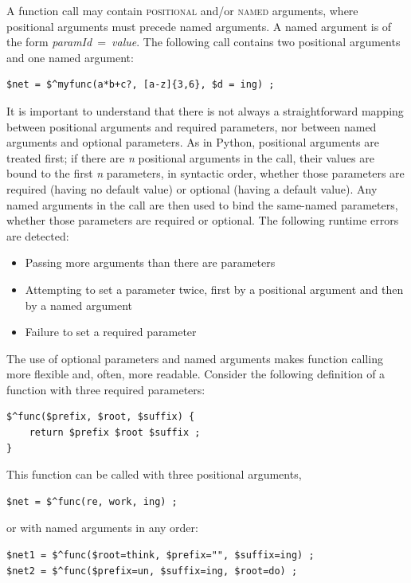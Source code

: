 \documentclass[letterpaper,12pt]{article}
\newcommand{\acro}{\textsc}
\begin{document}
A function call may contain \acro{positional} and/or \acro{named}
arguments, where positional arguments must precede named arguments.  A
named argument is of the form \emph{paramId}~=~\emph{value}.
The following call contains two positional arguments and one named
argument:

\begin{Verbatim}[fontsize=\small]
$net = $^myfunc(a*b+c?, [a-z]{3,6}, $d = ing) ;
\end{Verbatim}

\noindent
It is important to understand that there is not always a straightforward mapping
between positional arguments and required parameters, nor between named
arguments and optional parameters.  As in Python, positional arguments
are treated first; if there are \emph{n} positional arguments in the
call, their
values are bound to the first \emph{n} parameters, in syntactic order,
whether those
parameters are required (having no default value) or optional (having a
default value).  Any named arguments in the call are then used
to bind the same-named parameters, whether those parameters are
required or optional.  The following runtime errors are detected:

\begin{itemize}
\item
Passing more arguments than there are parameters
\item
Attempting to set a parameter twice, first by a positional argument and
then by a named argument
\item
Failure to set a required parameter
\end{itemize}

The use of optional parameters and named arguments makes function calling more flexible and,
often, more readable.  Consider the following definition of a function
with three required parameters:

\begin{Verbatim}[fontsize=\small]
$^func($prefix, $root, $suffix) {
	return $prefix $root $suffix ;
}
\end{Verbatim}

\noindent
This function can be called with three positional arguments,

\begin{Verbatim}[fontsize=\small]
$net = $^func(re, work, ing) ;
\end{Verbatim}

\noindent
or with named arguments in any order:

\begin{Verbatim}[fontsize=\small]
$net1 = $^func($root=think, $prefix="", $suffix=ing) ;
$net2 = $^func($prefix=un, $suffix=ing, $root=do) ;
\end{Verbatim}
\end{document}
